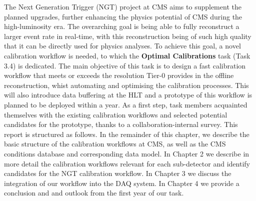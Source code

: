 The Next Generation Trigger (NGT) project at CMS aims to supplement the planned upgrades, further enhancing the physics potential of CMS during the high-luminosity era. The overarching goal is being able to fully reconstruct a larger event rate in real-time, with this reconstruction being of such high quality that it can be directly used for physics analyses.
\newline \newline
To achieve this goal, a novel calibration workflow is needed, to which the \textbf{Optimal Calibrations} task (Task 3.4) is dedicated. The main objective of this task is to design a fast calibration workflow that meets or exceeds the resolution Tier-0 provides in the offline reconstruction, whist automating and optimising the calibration processes. This will also introduce data buffering at the HLT and a prototype of this workflow is planned to be deployed within a year. As a first step, task members acquainted themselves with the existing calibration workflows and selected potential candidates for the prototype, thanks to a collaboration-internal survey. 
This report is structured as follows.
In the remainder of this chapter, we describe the basic structure of the calibration workflows at CMS, as well as the CMS conditions database and corresponding data model.
In Chapter 2 we describe in more detail the calibration workflows relevant for each sub-detector and identify candidates for the NGT calibration workflow.
In Chapter 3 we discuss the integration of our workflow into the DAQ system.
In Chapter 4 we provide a conclusion and and outlook from the first year of our task.


